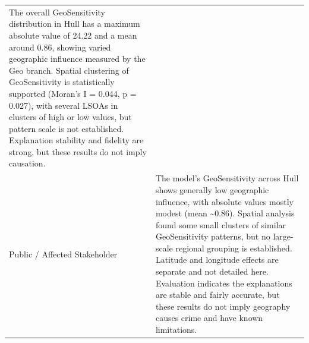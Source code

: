 \begin{table}[H]
\begin{tabularx}{\textwidth}{p{} X}
The overall GeoSensitivity distribution in Hull has a maximum absolute value of 24.22 and a mean around 0.86, showing varied geographic influence measured by the Geo branch. Spatial clustering of GeoSensitivity is statistically supported (Moran's I = 0.044, p = 0.027), with several LSOAs in clusters of high or low values, but pattern scale is not established. Explanation stability and fidelity are strong, but these results do not imply causation. \\
Public / Affected Stakeholder &
The model’s GeoSensitivity across Hull shows generally low geographic influence, with absolute values mostly modest (mean \textasciitilde{}0.86). Spatial analysis found some small clusters of similar GeoSensitivity patterns, but no large-scale regional grouping is established. Latitude and longitude effects are separate and not detailed here. Evaluation indicates the explanations are stable and fairly accurate, but these results do not imply geography causes crime and have known limitations. \\
\bottomrule
\end{tabularx}
\end{table}


